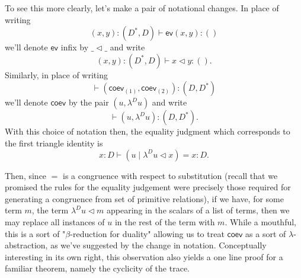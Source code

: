 \documentclass[pra,floatfix,
amsmath,superscriptaddress, 12pt]{article}
\theoremstyle{definition}
\newcommand{\evmap}{\mathsf{ev}}
\newcommand{\coev}{\mathsf{coev}}
\begin{document}
\par To see this more clearly, let's make a pair of notational changes. In place of writing 
\[
\left(x,y\right):\left(D^{*},D\right)\vdash\evmap\left(x,y\right):\left(\right)
\]
we'll denote $\evmap$ infix by $\_\triangleleft\_$ and write
\[
\left(x,y\right):\left(D^{*},D\right)\vdash x\triangleleft y:\left(\right).
\]
Similarly, in place of writing 
\[
\vdash\left(\coev_{\left(1\right)},\coev_{\left(2\right)}\right):\left(D,D^{*}\right)
\]
 we'll denote $\coev$ by the pair $\left(u,\lambda^{D}u\right)$
and write
\[
\vdash\left(u,\lambda^{D}u\right):\left(D,D^{*}\right).
\]
With this choice of notation then, the equality judgment which corresponds to
the first triangle identity is 
\[
x:D\vdash\left( u \; |\; \lambda^{D}u\triangleleft x\right)=x:D.
\]

\par

Then, since $=$ is a congruence with respect
to substitution (recall that we promised the rules for the equality judgement were precisely those  required for generating a congruence from set of primitive relations), if we have, for some term $m$, the term $\lambda^{D}u\triangleleft m$
appearing in the scalars of a list of terms, then we may replace all
instances of $u$ in the rest of the term with $m$. While a mouthful,
this is a sort of "$\beta$-reduction for duality" allowing us to treat $\coev$ as a sort of $\lambda$-abstraction, as we've suggested by the change in notation. Conceptually interesting in its own right, this observation also yields a one line
proof for a familiar theorem, namely the cyclicity of the trace.
\end{document}
